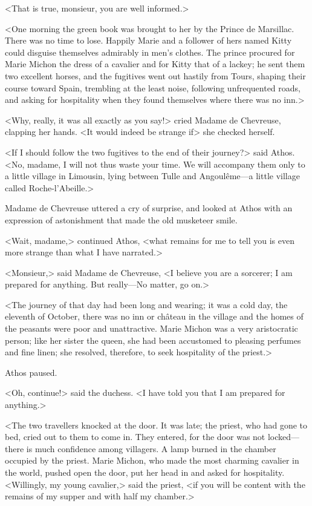 <That is true, monsieur, you are well informed.>

<One morning the green book was brought to her by the Prince de Marsillac. There was no time to lose. Happily Marie and a follower of hers named Kitty could disguise themselves admirably in men's clothes. The prince procured for Marie Michon the dress of a cavalier and for Kitty that of a lackey; he sent them two excellent horses, and the fugitives went out hastily from Tours, shaping their course toward Spain, trembling at the least noise, following unfrequented roads, and asking for hospitality when they found themselves where there was no inn.>

<Why, really, it was all exactly as you say!> cried Madame de Chevreuse, clapping her hands. <It would indeed be strange if\longdash> she checked herself.

<If I should follow the two fugitives to the end of their journey?> said Athos. <No, madame, I will not thus waste your time. We will accompany them only to a little village in Limousin, lying between Tulle and Angoulême—a little village called Roche-l'Abeille.>

Madame de Chevreuse uttered a cry of surprise, and looked at Athos with an expression of astonishment that made the old musketeer smile.

<Wait, madame,> continued Athos, <what remains for me to tell you is even more strange than what I have narrated.>

<Monsieur,> said Madame de Chevreuse, <I believe you are a sorcerer; I am prepared for anything. But really—No matter, go on.>

<The journey of that day had been long and wearing; it was a cold day, the eleventh of October, there was no inn or château in the village and the homes of the peasants were poor and unattractive. Marie Michon was a very aristocratic person; like her sister the queen, she had been accustomed to pleasing perfumes and fine linen; she resolved, therefore, to seek hospitality of the priest.>

Athos paused.

<Oh, continue!> said the duchess. <I have told you that I am prepared for anything.>

<The two travellers knocked at the door. It was late; the priest, who had gone to bed, cried out to them to come in. They entered, for the door was not locked—there is much confidence among villagers. A lamp burned in the chamber occupied by the priest. Marie Michon, who made the most charming cavalier in the world, pushed open the door, put her head in and asked for hospitality. <Willingly, my young cavalier,> said the priest, <if you will be content with the remains of my supper and with half my chamber.>


